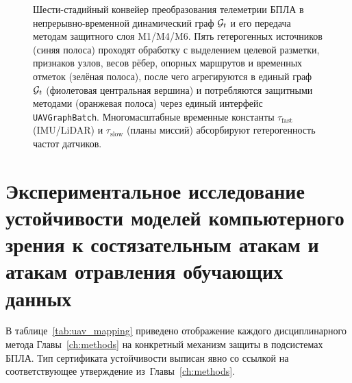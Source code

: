 \begin{figure}[htbp]
\caption{Шести-стадийный конвейер преобразования телеметрии БПЛА в
непрерывно-временной динамический граф $\mathcal{G}_t$ и его передача
методам защитного слоя \textsf{M1}/\textsf{M4}/\textsf{M6}. Пять
гетерогенных источников (синяя полоса) проходят обработку с
выделением целевой разметки, признаков узлов, весов рёбер, опорных
маршрутов и временных отметок (зелёная полоса), после чего
агрегируются в единый граф $\mathcal{G}_t$ (фиолетовая центральная
вершина) и потребляются защитными методами (оранжевая полоса)
через единый интерфейс \texttt{UAVGraphBatch}.
Многомасштабные временные константы $\tau_{\mathrm{fast}}$
(IMU/LiDAR) и $\tau_{\mathrm{slow}}$ (планы миссий) абсорбируют
гетерогенность частот датчиков.}
\label{fig:uav_telemetry_pipeline}
\end{figure}

\section{Экспериментальное исследование устойчивости моделей компьютерного зрения к состязательным атакам и атакам отравления обучающих данных}
\label{sec:uav_mapping}

В таблице~\ref{tab:uav_mapping} приведено отображение каждого
дисциплинарного метода Главы~\ref{ch:methods} на конкретный механизм
защиты в подсистемах БПЛА. Тип сертификата устойчивости выписан явно
со ссылкой на соответствующее утверждение из~Главы~\ref{ch:methods}.


